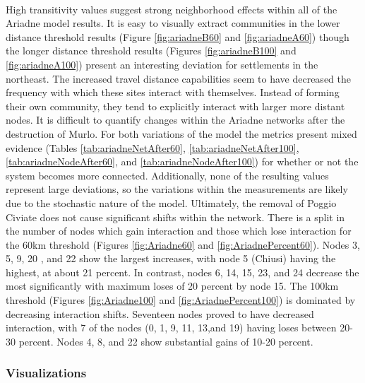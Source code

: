 \documentclass[12pt,a4paper]{thesis}
\begin{document}
\paragraph{}
High transitivity values suggest strong neighborhood effects within all of the Ariadne model results. It is easy to visually extract communities in the lower distance threshold results (Figure \ref{fig:ariadneB60} and \ref{fig:ariadneA60}) though the longer distance threshold results (Figures \ref{fig:ariadneB100} and \ref{fig:ariadneA100}) present an interesting deviation for settlements in the northeast. The increased travel distance capabilities seem to have decreased the frequency with which these sites interact with themselves. Instead of forming their own community, they tend to explicitly interact with larger more distant nodes. It is difficult to quantify changes within the Ariadne networks after the destruction of Murlo. For both variations of the model the metrics present mixed evidence (Tables \ref{tab:ariadneNetAfter60}, \ref{tab:ariadneNetAfter100}, \ref{tab:ariadneNodeAfter60}, and \ref{tab:ariadneNodeAfter100}) for whether or not the system becomes more connected. Additionally, none of the resulting values represent large deviations, so the variations within the measurements are likely due to the stochastic nature of the model. Ultimately, the removal of Poggio Civiate does not cause significant shifts within the network. There is a split in the number of nodes which gain interaction and those which lose interaction for the 60km threshold (Figures \ref{fig:Ariadne60} and \ref{fig:AriadnePercent60}). Nodes 3, 5, 9, 20 , and 22 show the largest increases, with node 5 (Chiusi) having the highest, at about 21 percent. In contrast, nodes 6, 14, 15, 23, and 24 decrease the most significantly with maximum loses of 20 percent by node 15. The 100km threshold (Figures \ref{fig:Ariadne100} and \ref{fig:AriadnePercent100}) is dominated by decreasing interaction shifts. Seventeen nodes proved to have decreased interaction, with 7 of the nodes (0, 1, 9, 11, 13,and 19) having loses between 20-30 percent. Nodes 4, 8, and 22 show substantial gains of 10-20 percent. 

\subsubsection{Visualizations}
\end{document}
